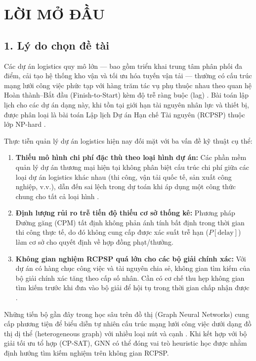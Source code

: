\chapter*{LỜI MỞ ĐẦU}

\section*{1. Lý do chọn đề tài}

Các dự án logistics quy mô lớn --- bao gồm triển khai trung tâm phân phối đa điểm, cải tạo hệ thống kho vận và tối ưu hóa tuyến vận tải --- thường có cấu trúc mạng lưới công việc phức tạp với hàng trăm tác vụ phụ thuộc nhau theo quan hệ Hoàn thành--Bắt đầu (Finish-to-Start) kèm độ trễ ràng buộc (lag) \cite{pmbok2017}. Bài toán lập lịch cho các dự án dạng này, khi tồn tại giới hạn tài nguyên nhân lực và thiết bị, được phân loại là bài toán Lập lịch Dự án Hạn chế Tài nguyên (RCPSP) thuộc lớp NP-hard \cite{kolisch1997psplib}.

Thực tiễn quản lý dự án logistics hiện nay đối mặt với ba vấn đề kỹ thuật cụ thể:

\begin{enumerate}
    \item \textbf{Thiếu mô hình chi phí đặc thù theo loại hình dự án:} Các phần mềm quản lý dự án thương mại hiện tại không phân biệt cấu trúc chi phí giữa các loại dự án logistics khác nhau (thi công, vận tải quốc tế, sản xuất công nghiệp, v.v.), dẫn đến sai lệch trong dự toán khi áp dụng một công thức chung cho tất cả loại hình \cite{christopher2016}.

    \item \textbf{Định lượng rủi ro trễ tiến độ thiếu cơ sở thống kê:} Phương pháp Đường găng (CPM) tất định không phản ánh tính bất định trong thời gian thi công thực tế, do đó không cung cấp được xác suất trễ hạn ($P[\text{delay}]$) làm cơ sở cho quyết định về hợp đồng phạt/thưởng.

    \item \textbf{Không gian nghiệm RCPSP quá lớn cho các bộ giải chính xác:} Với dự án có hàng chục công việc và tài nguyên chia sẻ, không gian tìm kiếm của bộ giải chính xác tăng theo cấp số nhân. Cần có cơ chế thu hẹp không gian tìm kiếm trước khi đưa vào bộ giải để hội tụ trong thời gian chấp nhận được \cite{kolisch1997psplib}.
\end{enumerate}

Những tiến bộ gần đây trong học sâu trên đồ thị (Graph Neural Networks) cung cấp phương tiện để biểu diễn tự nhiên cấu trúc mạng lưới công việc dưới dạng đồ thị dị thể (heterogeneous graph) với nhiều loại nút và cạnh \cite{hu2020hgt}. Khi kết hợp với bộ giải tối ưu tổ hợp (CP-SAT), GNN có thể đóng vai trò heuristic học được nhằm định hướng tìm kiếm nghiệm trên không gian RCPSP.

